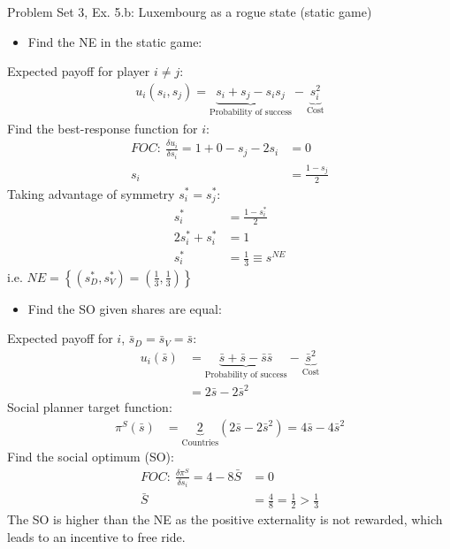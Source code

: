 \begin{frame}{Problem Set 3, Ex. 5.b: Luxembourg as a rogue state (static game)}
  \begin{multicols}{2}
    \begin{itemize}
      \item[(a)] Find the NE in the static game:
    \end{itemize}
    Expected payoff for player $i\neq j$:
    \begin{align*}
      u_i(s_i,s_j)=\underbrace{s_i+s_j-s_is_j}_\text{Probability of success}-\underbrace{s_i^2}_\text{Cost}
    \end{align*}
    Find the best-response function for $i$:
    \begin{align*}
      FOC:\ \frac{\delta u_i}{\delta s_i}=1+0-s_j-2s_i&=0\\
       s_i&=\frac{1-s_j}{2}
    \end{align*}
    Taking advantage of symmetry $s_i^{*}=s_j^{*}$:
    \begin{align*}
       s_i^{*}&=\frac{1-s_i^{*}}{2}\\
      2s_i^{*}+s_i^{*}&=1\\
       s_i^{*}&=\frac{1}{3}\equiv s^{NE}
    \end{align*}
    i.e. $NE=\left\{(s_D^{*},s_V^{*})=(\frac{1}{3},\frac{1}{3})\right\}$
  \vfill\null\columnbreak
    \begin{itemize}
      \item[(b)] Find the SO given shares are equal:
    \end{itemize}
    Expected payoff for $i$, $\bar{s}_D=\bar{s}_V=\bar{s}$:
    \begin{align*}
      u_i(\bar{s})&=\underbrace{\bar{s}+\bar{s}-\bar{s}\bar{s}}_\text{Probability of success}-\underbrace{\bar{s}^2}_\text{Cost}\\
                  &=2\bar{s}-2\bar{s}^2
    \end{align*}
    Social planner target function:
    \begin{align*}
      \pi^S(\bar{s})&=\underbrace{2}_\text{Countries}(2\bar{s}-2\bar{s}^2)=4\bar{s}-4\bar{s}^2
    \end{align*}
    Find the social optimum (SO):
    \begin{align*}
      FOC:\ \frac{\delta\pi^S}{\delta s_i}=4-8\bar{S}&=0\\
       \bar{S}&=\frac{4}{8}=\frac{1}{2}>\frac{1}{3}
    \end{align*}
    The SO is higher than the NE as the positive externality is not rewarded, which leads to an incentive to free ride.
  \vfill\null
  \end{multicols}
\end{frame}


